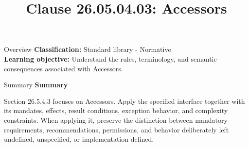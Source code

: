 \documentclass[10pt,letterpaper]{article}
\title{Clause 26.05.04.03: Accessors}
\author{}
\date{}
\begin{document}
\maketitle
\begin{CornellOverviewBox}{Overview}
\textbf{Classification:} Standard library - Normative\\[2pt]
\textbf{Learning objective:} Understand the rules, terminology, and semantic consequences associated with Accessors.
\end{CornellOverviewBox}\begin{CornellSummaryBox}{Summary}
{\sffamily\bfseries\color{Accent} Summary}\par\vspace{3pt}Section 26.5.4.3 focuses on Accessors. Apply the specified interface together with its mandates, effects, result conditions, exception behavior, and complexity constraints. When applying it, preserve the distinction between mandatory requirements, recommendations, permissions, and behavior deliberately left undefined, unspecified, or implementation-defined.
\end{CornellSummaryBox}
\end{document}

